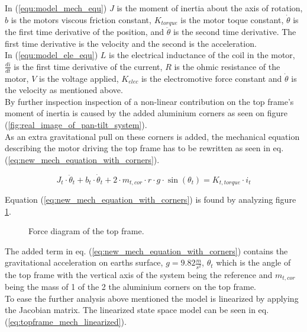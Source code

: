 \documentclass[../../main]{subfiles}
\begin{document}
In (\ref{equ:model_mech_equ}) $J$ is the moment of inertia about the axis of rotation, $b$ is the motors viscous friction constant, $K_{torque}$ is the motor toque constant, $\dot \theta$ is the first time derivative of the position, and $\ddot \theta$ is the second time derivative. The first time derivative is the velocity and the second is the acceleration.\\
In (\ref{equ:model_ele_equ}) $L$ is the electrical inductance of the coil in the motor, $\frac{di}{dt}$ is the first time derivative of the current, $R$ is the ohmic resistance of the motor, $V$ is the voltage applied, $K_{elec}$ is the electromotive force constant and $\dot \theta$ is the velocity as mentioned above.\\

By further inspection inspection of a non-linear contribution on the top frame's moment of inertia is caused by the added aluminium corners as seen on figure (\ref{fig:real_image_of_pan-tilt_system}).\\
As an extra gravitational pull on these corners is added, the mechanical equation describing the motor driving the top frame has to be rewritten as seen in eq. (\ref{eq:new_mech_equation_with_corners}).

\begin{equation}
  \label{eq:new_mech_equation_with_corners}
  J_t\cdot \ddot \theta_t + b_t\cdot \dot \theta_t + 2\cdot m_{t,cor} \cdot r \cdot g \cdot \sin(\theta_t) = K_{t,torque}\cdot i_t
\end{equation}

Equation (\ref{eq:new_mech_equation_with_corners}) is found by analyzing figure \ref{fig:TrekantDiagramForce}.

\begin{figure}[h]
  \centering
  \def\svgwidth{0.4\columnwidth}
  
  \caption{Force diagram of the top frame.}
  \label{fig:TrekantDiagramForce}
\end{figure}

The added term in eq. (\ref{eq:new_mech_equation_with_corners}) contains the gravitational acceleration on earths surface, $g = 9.82 \si{\frac{m}{s^2}}$, $\theta_t$ which is the angle of the top frame with the vertical axis of the system being the reference and $m_{t,cor}$ being the mass of 1 of the 2 the aluminium corners on the top frame.\\
To ease the further analysis above mentioned the model is linearized by applying the Jacobian matrix. The linearized state space model can be seen in eq. (\ref{eq:topframe_mech_linearized}).
 
\end{document}
